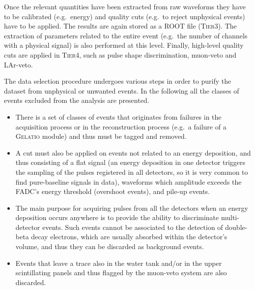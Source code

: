 Once the relevant quantities have been extracted from raw waveforms they have to be calibrated (e.g.~energy) and quality cuts (e.g.~to reject unphysical events) have to be applied. The results are again stored as a ROOT file (\textsc{Tier3}). The extraction of parameters related to the entire event (e.g.~the number of channels with a physical signal) is also performed at this level. Finally, high-level quality cuts are applied in \textsc{Tier4}, such as pulse shape discrimination, muon-veto and LAr-veto.

 The data selection procedure undergoes various steps in order to purify the dataset from unphysical or unwanted events. In the following all the classes of events excluded from the analysis are presented.
\begin{itemize}
	\item There is a set of classes of events that originates from failures in the acquisition process or in the reconstruction process (e.g.~a failure of a \textsc{Gelatio} module) and thus must be tagged and removed.
	\item A cut must also be applied on events not related to an energy deposition, and thus consisting of a flat signal (an energy deposition in one detector triggers the sampling of the pulses registered in all detectors, so it is very common to find pure-baseline signals in data), waveforms which amplitude exceeds the FADC's energy threshold (overshoot events), and pile-up events.
	\item The main purpose for acquiring pulses from all the detectors when an energy deposition occurs anywhere is to provide the ability to discriminate multi-detector events. Such events cannot be associated to the detection of double-beta decay electrons, which are usually absorbed within the detector's volume, and thus they can be discarded as background events.
	\item Events that leave a trace also in the water tank and/or in the upper scintillating panels and thus flagged by the muon-veto system are also discarded.
\end{itemize}

